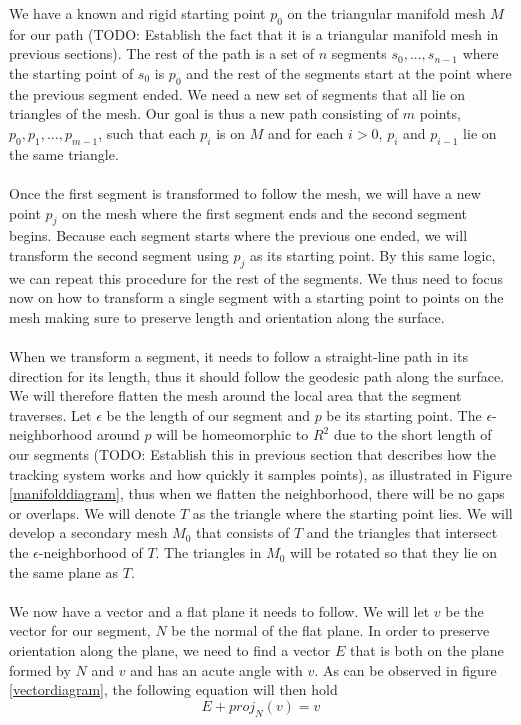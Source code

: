 We have a known and rigid starting point $p_0$ on the triangular manifold mesh $M$ for our path (TODO: Establish the fact that it is a triangular manifold mesh in previous sections). The rest of the path is a set of $n$ segments $s_0,...,s_{n-1}$ where the starting point of $s_0$ is $p_0$ and the rest of the segments start at the point where the previous segment ended. We need a new set of segments that all lie on triangles of the mesh. Our goal is thus a new path consisting of $m$ points, $p_0, p_1,...,p_{m-1}$, such that each $p_i$ is on $M$ and for each $i>0$, $p_{i}$ and $p_{i-1}$ lie on the same triangle. \\
\\
Once the first segment is transformed to follow the mesh, we will have a new point $p_j$ on the mesh where the first segment ends and the second segment begins. Because each segment starts where the previous one ended, we will transform the second segment using $p_j$ as its starting point. By this same logic, we can repeat this procedure for the rest of the segments. We thus need to focus now on how to transform a single segment with a starting point to points on the mesh making sure to preserve length and orientation along the surface. \\
\\
When we transform a segment, it needs to follow a straight-line path in its direction for its length, thus it should follow the geodesic path along the surface. We will therefore flatten the mesh around the local area that the segment traverses. Let $\epsilon$ be the length of our segment and $p$ be its starting point. The $\epsilon$-neighborhood around $p$ will be homeomorphic to $R^2$ due to the short length of our segments (TODO: Establish this in previous section that describes how the tracking system works and how quickly it samples points), as illustrated in Figure \ref{manifolddiagram}, thus when we flatten the neighborhood, there will be no gaps or overlaps. We will denote $T$ as the triangle where the starting point lies. We will develop a secondary mesh $M_0$ that consists of $T$ and the triangles that intersect the $\epsilon$-neighborhood of $T$. The triangles in $M_0$ will be rotated so that they lie on the same plane as $T$. \\
\\
We now have a vector and a flat plane it needs to follow. We will let $v$ be the vector for our segment, $N$ be the normal of the flat plane. In order to preserve orientation along the plane, we need to find a vector $E$ that is both on the plane formed by $N$ and $v$ and has an acute angle with $v$. As can be observed in figure \ref{vectordiagram}, the following equation will then hold
\[
E + proj_N(v) = v
\]

